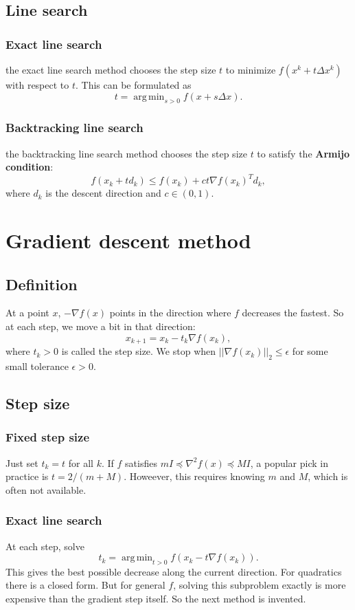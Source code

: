 \documentclass[lang=en,color=blue,mode=fancy,titlestyle=hang]{elegantbook}
\DeclareMathOperator*{\argmin}{arg\,min}
\begin{document}
\subsection{Line search}
\subsubsection{Exact line search} the exact line search method chooses the step size $t$
to minimize $f(x^k + t \Delta x^k)$ with respect to $t$. This can be formulated as
\[
t = \argmin_{s > 0} f(x + s \Delta x).
\]
\subsubsection{Backtracking line search} the backtracking line search method chooses the step
size $t$ to satisfy the \textbf{Armijo condition}:
\[
f(x_k + t d_k) \leq f(x_k) + c t \nabla f(x_k)^T d_k,
\]
where $d_k$ is the descent direction and $c \in (0, 1)$.

\section{Gradient descent method}
\subsection{Definition}
At a point $x$, $-\nabla f(x)$ points in the direction where $f$ decreases the fastest. So at each step, we move
a bit in that direction:
\begin{equation}
x_{k+1} = x_k - t_k \nabla f(x_k),
\end{equation}
where $t_k > 0$ is called the step size. We stop when $||\nabla f(x_k)||_2 \leq \epsilon$
for some small tolerance $\epsilon > 0$.

\subsection{Step size}
\subsubsection{Fixed step size} Just set $t_k = t$ for all $k$. If $f$ satisfies
$m I \preceq \nabla^2 f(x) \preceq M I$, a popular pick in practice is $t = 2/(m + M)$. Howeever,
this requires knowing $m$ and $M$, which is often not available.

\subsubsection{Exact line search} At each step, solve
\[
t_k = \argmin_{t > 0} f(x_k - t \nabla f(x_k)).
\]
This gives the best possible decrease along the current direction. For quadratics
there is a closed form. But for general $f$, solving this subproblem exactly is
more expensive than the gradient step itself. So the next method is invented.
\end{document}
